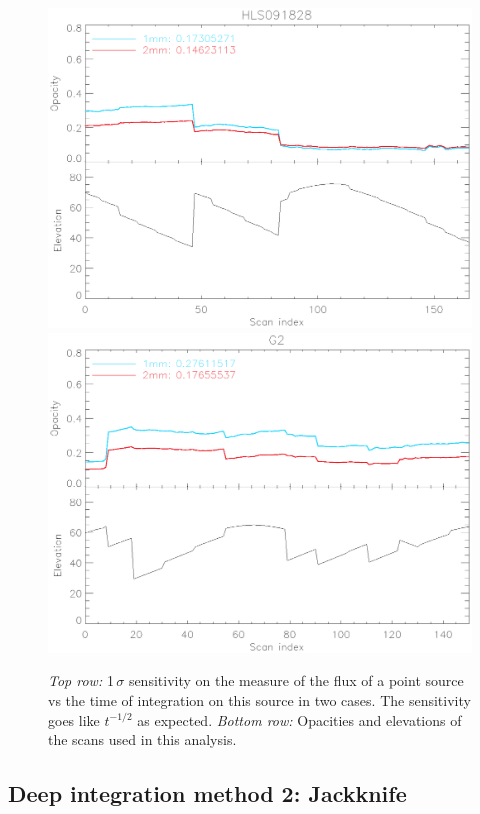 \begin{figure}[!thbp]
\begin{center}
\includegraphics[clip, angle=0, scale =0.4]{Figures/hls_opacity_and_elev.eps}
\includegraphics[clip, angle=0, scale =0.4]{Figures/g2_opacity_and_elev.eps}
\caption[NEFD vs time]{\emph{Top row:} 1\,$\sigma$ sensitivity on the
  measure of the flux of a point source vs the time of integration on this
  source in two cases. The sensitivity goes like $t^{-1/2}$ as
  expected. \emph{Bottom row:} Opacities and elevations of the scans used in
  this analysis. }
\label{fig:nefd_plots}
\end{center}
\end{figure}

\subsection{Deep integration method 2: Jackknife}


